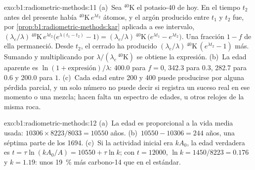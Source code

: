 \begin{solution}{exo:b1:radiometric-methods:11}
(a)~Sea ${}^{40}\mathrm{K}$ el potasio-40 de hoy. En el tiempo $t_2$ antes del
presente había ${}^{40}\mathrm{K}\,e^{\lambda t_2}$ átomos, y el argón producido entre $t_1$ y $t_2$ fue, por \cref{prop:b1:radiometric-methods:kar} aplicada a ese intervalo,
$(\lambda_e/\lambda)\,{}^{40}\mathrm{K}\,e^{\lambda
t_2}\bigl(e^{\lambda (t_1 - t_2)} - 1\bigr) = (\lambda_e/\lambda)\,
{}^{40}\mathrm{K}\,\bigl(e^{\lambda t_1} - e^{\lambda t_2}\bigr)$. Una fracción
$1 - f$ de ella permaneció. Desde $t_2$, el  cerrado ha producido
$(\lambda_e/\lambda)\,{}^{40}\mathrm{K}\,(e^{\lambda t_2} - 1)$ más. Sumando y
multiplicando por $\lambda/(\lambda_e\,{}^{40}\mathrm{K})$ se obtiene la expresión.
(b)~La edad aparente es $\ln(1 + \text{expresión})/\lambda$: \qty{400.0}{\Myr} para
$f = 0$, \qty{342.3}{\Myr} para $0.3$, \qty{282.7}{\Myr} para $0.6$ y
\qty{200.0}{\Myr} para $1$. (c)~Cada edad entre \qty{200}{\Myr} y
\qty{400}{\Myr} puede producirse por alguna pérdida parcial, y un solo número no puede
decir si registra un suceso real en ese momento o una mezcla; hacen falta un espectro de edades, u otros relojes de la misma roca.
\end{solution}

\begin{solution}{exo:b1:radiometric-methods:12}
(a)~La edad es proporcional a la vida media usada: $10306 \times 8223/8033 =
\num{10550}$ años. (b)~$10550 - 10306 = 244$ años, una séptima parte de los
\num{1694}. (c)~Si la actividad inicial era $k A_0$, la edad verdadera es $t = \tau
\ln(k A_0/A) = \num{10550} + \tau \ln k$; con $t = \num{12000}$, $\ln k =
1450/8223 = 0.176$ y $k = 1.19$: unos \qty{19}{\percent} más carbono-14 que
en el estándar.
\end{solution}

